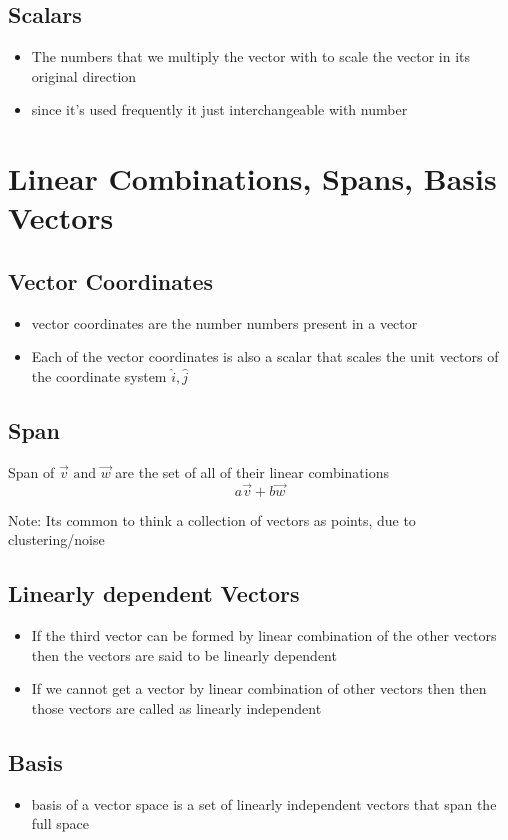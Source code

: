 \documentclass[a4paper]{article}
\begin{document}
\subsection{Scalars}
\begin{itemize}
	\item The numbers that we multiply the vector with to scale the vector
	      in its original direction
	\item since it's used frequently it just interchangeable with number
\end{itemize}


\newpage
\section{Linear Combinations, Spans, Basis Vectors}

\subsection{Vector Coordinates}
\begin{itemize}
	\item vector coordinates are the number numbers present in a vector
	\item Each of the vector coordinates is also a scalar
	      that scales the unit vectors of the coordinate system $\hat{i}, \hat{j}$
\end{itemize}

\subsection{Span}
Span of $\vec{v} \text{ and } \vec{w}$ are the set of all of their linear combinations
\[
	a \vec{v} + b \vec{w}
\]

Note: Its common to think a collection of vectors as points, due to clustering/noise

\subsection{Linearly dependent Vectors}
\begin{itemize}
	\item If the third vector can be formed by linear combination of the other vectors
	      then the vectors are said to be linearly dependent
	\item If we cannot get a vector by linear combination of other vectors then
	      then those vectors are called as linearly independent
\end{itemize}

\subsection{Basis}
\begin{itemize}
	\item basis of a vector space is a set of linearly independent vectors
	      that span the full space
\end{itemize}
\end{document}
